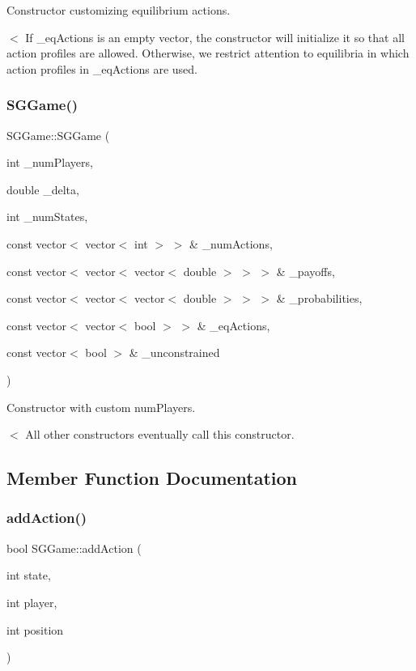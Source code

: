 Constructor customizing equilibrium actions. 

$<$ If \+\_\+eq\+Actions is an empty vector, the constructor will initialize it so that all action profiles are allowed. Otherwise, we restrict attention to equilibria in which action profiles in \+\_\+eq\+Actions are used. \mbox{\label{classSGGame_af6715eb62a0133849bbe9fe60fe113ab}} 
\subsubsection{\texorpdfstring{S\+G\+Game()}{SGGame()}\hspace{0.1cm}{\footnotesize\ttfamily [4/4]}}
{\footnotesize\ttfamily S\+G\+Game\+::\+S\+G\+Game (\begin{DoxyParamCaption}\item[{int}]{\+\_\+num\+Players,  }\item[{double}]{\+\_\+delta,  }\item[{int}]{\+\_\+num\+States,  }\item[{const vector$<$ vector$<$ int $>$ $>$ \&}]{\+\_\+num\+Actions,  }\item[{const vector$<$ vector$<$ vector$<$ double $>$ $>$ $>$ \&}]{\+\_\+payoffs,  }\item[{const vector$<$ vector$<$ vector$<$ double $>$ $>$ $>$ \&}]{\+\_\+probabilities,  }\item[{const vector$<$ vector$<$ bool $>$ $>$ \&}]{\+\_\+eq\+Actions,  }\item[{const vector$<$ bool $>$ \&}]{\+\_\+unconstrained }\end{DoxyParamCaption})}



Constructor with custom num\+Players. 

$<$ All other constructors eventually call this constructor. 

\subsection{Member Function Documentation}
\mbox{\label{classSGGame_a2b3ddf3f5dfca8514cba1933205c5ec3}} 
\subsubsection{\texorpdfstring{add\+Action()}{addAction()}}
{\footnotesize\ttfamily bool S\+G\+Game\+::add\+Action (\begin{DoxyParamCaption}\item[{int}]{state,  }\item[{int}]{player,  }\item[{int}]{position }\end{DoxyParamCaption})}



